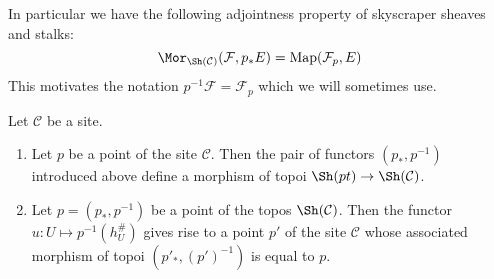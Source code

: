 \noindent
In particular we have the following adjointness property
of skyscraper sheaves and stalks:
$$
\Mor_{\Sh(\mathcal{C})}(\mathcal{F}, p_*E)
=
\text{Map}(\mathcal{F}_p, E)
$$
This motivates the notation $p^{-1}\mathcal{F} = \mathcal{F}_p$
which we will sometimes use.

\begin{lemma}
\label{lemma-point-site-topos}
Let $\mathcal{C}$ be a site.
\begin{enumerate}
\item Let $p$ be a point of the site $\mathcal{C}$.
Then the pair of functors $(p_*, p^{-1})$ introduced
above define a morphism of topoi
$\Sh(pt) \to \Sh(\mathcal{C})$.
\item Let $p = (p_*, p^{-1})$
be a point of the topos $\Sh(\mathcal{C})$.
Then the functor $u : U \mapsto p^{-1}(h_U^\#)$ gives
rise to a point $p'$ of the site $\mathcal{C}$
whose associated morphism of topoi $(p'_*, (p')^{-1})$
is equal to $p$.
\end{enumerate}
\end{lemma}

